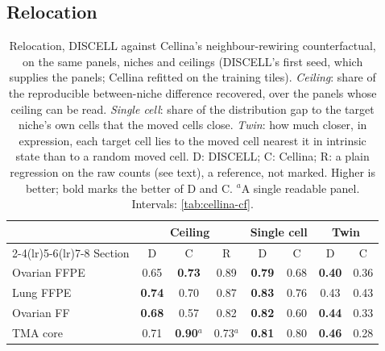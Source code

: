 \subsection{Relocation}
\label{sec:relocation}

\begin{table}[t]
\centering
\caption{Relocation, DISCELL against Cellina's neighbour-rewiring counterfactual, on the same panels, niches and ceilings (DISCELL's first seed, which supplies the panels; Cellina refitted on the training tiles). \emph{Ceiling}: share of the reproducible between-niche difference recovered, over the panels whose ceiling can be read. \emph{Single cell}: share of the distribution gap to the target niche's own cells that the moved cells close. \emph{Twin}: how much closer, in expression, each target cell lies to the moved cell nearest it in intrinsic state than to a random moved cell. D: DISCELL; C: Cellina; R: a plain regression on the raw counts (see text), a reference, not marked. Higher is better; bold marks the better of D and C. $^{a}$A single readable panel. Intervals: \cref{tab:cellina-cf}.}
\label{tab:relocation}
\footnotesize
\setlength{\tabcolsep}{3pt}
\begin{tabular}{@{}lccccccc@{}}
\toprule
 & \multicolumn{3}{c}{Ceiling} & \multicolumn{2}{c}{Single cell} & \multicolumn{2}{c}{Twin} \\
\cmidrule(lr){2-4}\cmidrule(lr){5-6}\cmidrule(lr){7-8}
Section & D & C & R & D & C & D & C \\
\midrule
Ovarian FFPE & 0.65 & \textbf{0.73} & 0.89 & \textbf{0.79} & 0.68 & \textbf{0.40} & 0.36 \\
Lung FFPE    & \textbf{0.74} & 0.70 & 0.87 & \textbf{0.83} & 0.76 & 0.43 & 0.43 \\
Ovarian FF   & \textbf{0.68} & 0.57 & 0.82 & \textbf{0.82} & 0.60 & \textbf{0.44} & 0.33 \\
TMA core     & 0.71 & \textbf{0.90}$^{a}$ & 0.73$^{a}$ & \textbf{0.81} & 0.80 & \textbf{0.46} & 0.28 \\
\bottomrule
\end{tabular}
\end{table}


